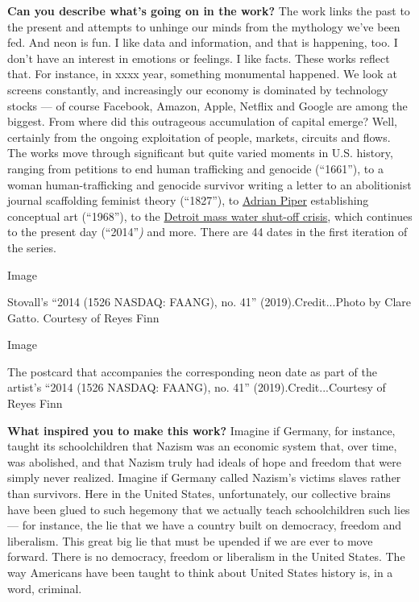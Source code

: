\textbf{Can you describe what's going on in the work?} The work links
the past to the present and attempts to unhinge our minds from the
mythology we've been fed. And neon is fun. I like data and information,
and that is happening, too. I don't have an interest in emotions or
feelings. I like facts. These works reflect that. For instance, in xxxx
year, something monumental happened. We look at screens constantly, and
increasingly our economy is dominated by technology stocks --- of course
Facebook, Amazon, Apple, Netflix and Google are among the biggest. From
where did this outrageous accumulation of capital emerge? Well,
certainly from the ongoing exploitation of people, markets, circuits and
flows. The works move through significant but quite varied moments in
U.S. history, ranging from petitions to end human trafficking and
genocide (``1661''), to a woman human-trafficking and genocide survivor
writing a letter to an abolitionist journal scaffolding feminist theory
(``1827''), to
\href{https://www.nytimes.com/2018/06/27/magazine/adrian-pipers-self-imposed-exile-from-america-and-from-race-itself.html}{Adrian
Piper} establishing conceptual art (``1968''), to the
\href{https://www.nytimes.com/2014/07/19/us/protesters-picket-detroit-over-move-to-shut-off-water.html}{Detroit
mass water shut-off crisis}, which continues to the present day
(``2014''\emph{)} and more. There are 44 dates in the first iteration of
the series.

Image

Stovall's ``2014 (1526 NASDAQ: FAANG), no. 41'' (2019).Credit...Photo by
Clare Gatto. Courtesy of Reyes Finn

Image

The postcard that accompanies the corresponding neon date as part of the
artist's ``2014 (1526 NASDAQ: FAANG), no. 41'' (2019).Credit...Courtesy
of Reyes Finn

\textbf{What inspired you to make this work?} Imagine if Germany, for
instance, taught its schoolchildren that Nazism was an economic system
that, over time, was abolished, and that Nazism truly had ideals of hope
and freedom that were simply never realized. Imagine if Germany called
Nazism's victims slaves rather than survivors. Here in the United
States, unfortunately, our collective brains have been glued to such
hegemony that we actually teach schoolchildren such lies --- for
instance, the lie that we have a country built on democracy, freedom and
liberalism. This great big lie that must be upended if we are ever to
move forward. There is no democracy, freedom or liberalism in the United
States. The way Americans have been taught to think about United States
history is, in a word, criminal.

